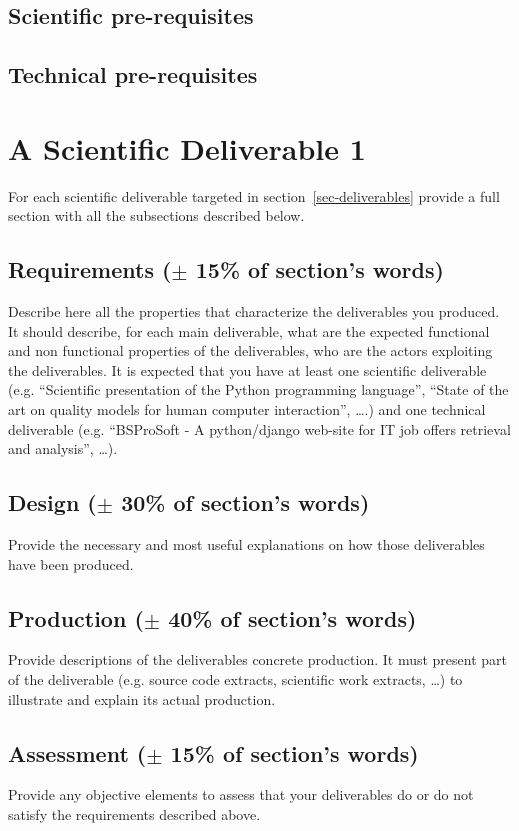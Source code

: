 \documentclass[conference,compsoc]{IEEEtran}
\begin{document}
\subsection{Scientific pre-requisites}
\subsection{Technical pre-requisites}


\section{ A Scientific Deliverable 1}
For each scientific deliverable targeted in section~\ref{sec-deliverables} provide a full section with all the subsections described below.
\label{sec-production}
\subsection{Requirements ($\pm$ 15\% of section's words)}
Describe here all the properties that characterize the deliverables you produced. It should describe, for each main deliverable, what are the expected functional and non functional properties of the deliverables, who are the actors exploiting the deliverables. It is expected that you have at least one scientific deliverable (e.g. ``Scientific presentation of the Python programming language'', ``State of the art on quality models for human computer interaction'', \ldots.) and one technical deliverable (e.g. ``BSProSoft - A python/django web-site for IT job offers retrieval and analysis'', \ldots). 
\subsection{Design ($\pm$ 30\% of section's words)}
Provide the necessary and most useful explanations on how those deliverables have been produced.
\subsection{Production ($\pm$ 40\% of section's words)}
Provide descriptions of the deliverables concrete production. It must present part of the deliverable (e.g. source code extracts, scientific work extracts, \ldots) to illustrate and explain its actual production.
\subsection{Assessment ($\pm$ 15\% of section's words)}
Provide any objective elements to assess that your deliverables do or do not satisfy the requirements described above. 
\end{document}
